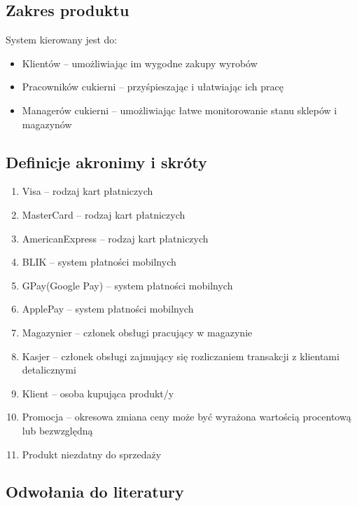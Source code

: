 \documentclass{article}
\begin{document}
\subsection{Zakres produktu}
System kierowany jest do:
\begin{itemize}
    \item Klientów -- umożliwiając im wygodne zakupy wyrobów
    \item Pracowników cukierni -- przyśpieszając i ułatwiając ich pracę
    \item Managerów cukierni --  umożliwiając łatwe monitorowanie stanu sklepów i magazynów 
\end{itemize}
\subsection{Definicje akronimy i skróty}
\begin{enumerate}
    \item Visa -- rodzaj kart płatniczych
    \item MasterCard -- rodzaj kart płatniczych
    \item AmericanExpress -- rodzaj kart płatniczych
    \item BLIK -- system płatności mobilnych
    \item GPay(Google Pay) --  system płatności mobilnych
    \item ApplePay --  system płatności mobilnych
    \item Magazynier -- członek obsługi pracujący  w magazynie
    \item Kasjer -- członek obsługi zajmujący się rozliczaniem transakcji z klientami detalicznymi 
    \item Klient -- osoba kupująca produkt/y 
    \item Promocja -- okresowa zmiana ceny może być wyrażona wartością procentową lub bezwzględną
    \item Produkt niezdatny do sprzedaży
\end{enumerate}
\subsection{Odwołania do literatury}
\end{document}
